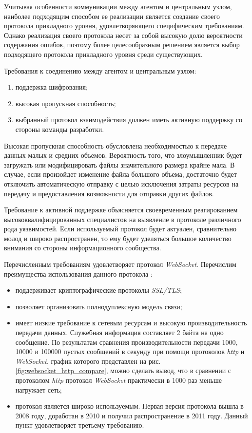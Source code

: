 Учитывая особенности коммуникации между агентом и центральным узлом, наиболее подходящим способом ее реализации является создание своего протокола прикладного уровня, удовлетворяющего специфическим требованиям. Однако реализация своего протокола несет за собой высокую долю вероятности содержания ошибок, поэтому более целесообразным  решением является выбор подходящего протокола прикладного уровня среди существующих.

Требования к соединению между агентом и центральным узлом:
\begin{enumerate}
\item поддержка шифрования;
\item высокая пропускная способность;
\item выбранный протокол взаимодействия должен иметь активную поддержку со стороны команды разработки.
\end{enumerate}

Высокая пропускная способность обусловлена необходимостью к передаче данных малых и средних объемов. Вероятность того, что злоумышленник будет загружать или модифицировать файлы значительного размера крайне мала. В случае, если произойдет изменение файла большого объема, достаточно будет отключить автоматическую отправку с целью исключения затраты ресурсов на передачу и предоставления возможности для отправки других файлов.

Требование к активной поддержке объясняется своевременным реагированием высококвалифицированных специалистов на выявление в протоколе различного рода уязвимостей. Если используемый протокол будет актуален, сравнительно молод и широко распространен, то ему будет уделяться большое количество внимания со стороны информационного сообщества.

Перечисленным требованиям удовлетворяет протокол \textit{WebSocket}. Перечислим преимущества использования данного протокола \citep{Fedorenkov2015WebSocket}:
\begin{itemize}
\item поддерживает криптографические протоколы \textit{SSL/TLS};
\item позволяет организовать полнодуплексную модель связи;
\item имеет низкие требование к сетевым ресурсам и высокую производительность передачи данных. Служебная информация составляет 2 байта на одно сообщение. По результатам сравнения \citep{Fedorenkov2015WebSocket} производительности передачи 1000, 10000 и 100000 пустых сообщений в секунду при помощи протоколов \textit{http} и \textit{WebSocket}, график которого представлен на рис. \ref{fig:websocket_http_compare}, можно сделать вывод, что в сравнении с протоколом \textit{http} протокол \textit{WebSocket} практически в 1000 раз меньше нагружает сеть;
\item протокол является широко используемым. Первая версия протокола вышла в 2008 году, доработан в 2010 и получил распространение в 2011 году. Данный пункт удовлетворяет третьему требованию.
\end{itemize}

